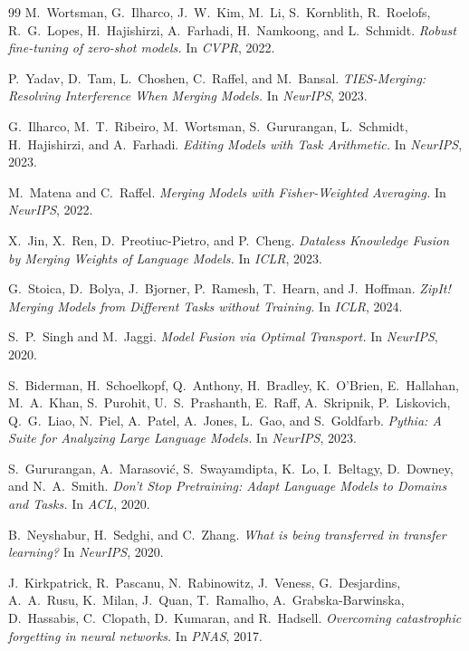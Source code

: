 \documentclass[11pt,a4paper]{article}
\begin{document}
\begin{thebibliography}{99}
M.\ Wortsman, G.\ Ilharco, J.\ W.\ Kim, M.\ Li, S.\ Kornblith, R.\ Roelofs, R.\ G.\ Lopes, H.\ Hajishirzi, A.\ Farhadi, H.\ Namkoong, and L.\ Schmidt.
\textit{Robust fine-tuning of zero-shot models.}
In \emph{CVPR}, 2022.

P.\ Yadav, D.\ Tam, L.\ Choshen, C.\ Raffel, and M.\ Bansal.
\textit{TIES-Merging: Resolving Interference When Merging Models.}
In \emph{NeurIPS}, 2023.

G.\ Ilharco, M.\ T.\ Ribeiro, M.\ Wortsman, S.\ Gururangan, L.\ Schmidt, H.\ Hajishirzi, and A.\ Farhadi.
\textit{Editing Models with Task Arithmetic.}
In \emph{NeurIPS}, 2023.

M.\ Matena and C.\ Raffel.
\textit{Merging Models with Fisher-Weighted Averaging.}
In \emph{NeurIPS}, 2022.

X.\ Jin, X.\ Ren, D.\ Preotiuc-Pietro, and P.\ Cheng.
\textit{Dataless Knowledge Fusion by Merging Weights of Language Models.}
In \emph{ICLR}, 2023.

G.\ Stoica, D.\ Bolya, J.\ Bjorner, P.\ Ramesh, T.\ Hearn, and J.\ Hoffman.
\textit{ZipIt! Merging Models from Different Tasks without Training.}
In \emph{ICLR}, 2024.

S.\ P.\ Singh and M.\ Jaggi.
\textit{Model Fusion via Optimal Transport.}
In \emph{NeurIPS}, 2020.

S.\ Biderman, H.\ Schoelkopf, Q.\ Anthony, H.\ Bradley, K.\ O'Brien, E.\ Hallahan, M.\ A.\ Khan, S.\ Purohit, U.\ S.\ Prashanth, E.\ Raff, A.\ Skripnik, P.\ Liskovich, Q.\ G.\ Liao, N.\ Piel, A.\ Patel, A.\ Jones, L.\ Gao, and S.\ Goldfarb.
\textit{Pythia: A Suite for Analyzing Large Language Models.}
In \emph{NeurIPS}, 2023.

S.\ Gururangan, A.\ Marasovi\'{c}, S.\ Swayamdipta, K.\ Lo, I.\ Beltagy, D.\ Downey, and N.\ A.\ Smith.
\textit{Don't Stop Pretraining: Adapt Language Models to Domains and Tasks.}
In \emph{ACL}, 2020.

B.\ Neyshabur, H.\ Sedghi, and C.\ Zhang.
\textit{What is being transferred in transfer learning?}
In \emph{NeurIPS}, 2020.

J.\ Kirkpatrick, R.\ Pascanu, N.\ Rabinowitz, J.\ Veness, G.\ Desjardins, A.\ A.\ Rusu, K.\ Milan, J.\ Quan, T.\ Ramalho, A.\ Grabska-Barwinska, D.\ Hassabis, C.\ Clopath, D.\ Kumaran, and R.\ Hadsell.
\textit{Overcoming catastrophic forgetting in neural networks.}
In \emph{PNAS}, 2017.


\end{thebibliography}
\end{document}

